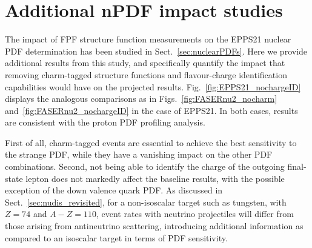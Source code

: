 \section{Additional nPDF impact studies}
\label{app:nPDF_impact_appendix}

The impact of FPF structure function measurements on the
EPPS21 nuclear PDF determination has been studied in Sect.~\ref{sec:nuclearPDFs}.
%
Here we provide additional results from this study, and specifically quantify the impact
that removing charm-tagged structure functions and flavour-charge
identification capabilities would have on the projected results.
%
Fig.~\ref{fig:EPPS21_nochargeID} displays
the analogous comparisons as in Figs.~\ref{fig:FASERnu2_nocharm}
and~\ref{fig:FASERnu2_nochargeID} in the case of EPPS21.
%
In both cases, results are consistent with the proton PDF profiling analysis.

First of all, charm-tagged events are essential to achieve the best
sensitivity to the strange PDF, while they have a vanishing impact on the
other PDF combinations.
%
Second, not being able to identify the charge of the outgoing final-state lepton
does not markedly affect  the baseline results, with the possible exception
of the down valence quark PDF.
%
As discussed in Sect.~\ref{sec:nudis_revisited}, for a non-isoscalar target
such as tungsten, with $Z=74$ and $A-Z=110$, event rates with neutrino projectiles
will differ from those arising from antineutrino scattering, introducing
additional information as compared to an isoscalar target in terms of PDF sensitivity.

